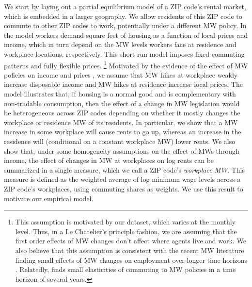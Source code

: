 We start by laying out a partial equilibrium model of a ZIP code's rental market,
which is embedded in a larger geography.
We allow residents of this ZIP code to commute to other ZIP codes to work, 
potentially under a different MW policy.
In the model workers demand square feet of housing as a function of local prices 
and income, which in turn depend on the MW levels workers face at residence and 
workplace locations, respectively.
This short-run model imposes fixed commuting patterns and fully flexible 
prices.%
\footnote{This assumption is motivated by our dataset, which varies at the 
monthly level. Thus, in a Le Chatelier's principle fashion, we are assuming that
the first order effects of MW changes don't affect where agents live and work.
We also believe that this assumption is consistent with the recent MW literature
finding small effects of MW changes on employment over longer time horizons
\parencite[see][for a review]{Dube2019}.
Relatedly, \textcite{PerezPerez2021} finds small elasticities of commuting to MW 
policies in a time horizon of several years.}
Motivated by the evidence of the effect of MW policies on 
income \parencite{Dube2019Income, CegnizEtAl2019} and 
prices \parencite{AllegrettoReich2018, Leung2021},
we assume that MW hikes at workplace weakly increase disposable income and MW 
hikes at residence increase local prices.
The model illustrates that, if housing is a normal good and is complementary 
with non-tradable consumption, then the effect of a change in MW legislation 
would be heterogeneous across ZIP codes depending on whether it mostly changes 
the workplace or residence MW of its residents.
In particular, we show that a MW increase in some workplace will cause rents to 
go up, whereas an increase in the residence will (conditional on a constant 
workplace MW) lower rents.
We also show that, under some homogeneity assumptions on the effect of MWs 
through income, the effect of changes in MW at workplaces on log rents can be 
summarized in a single measure, which we call a ZIP code's \textit{workplace MW}.
This measure is defined as the weighted average of log minimum wage levels 
across a ZIP code's workplaces, using commuting shares as weights.
We use this result to motivate our empirical model.


